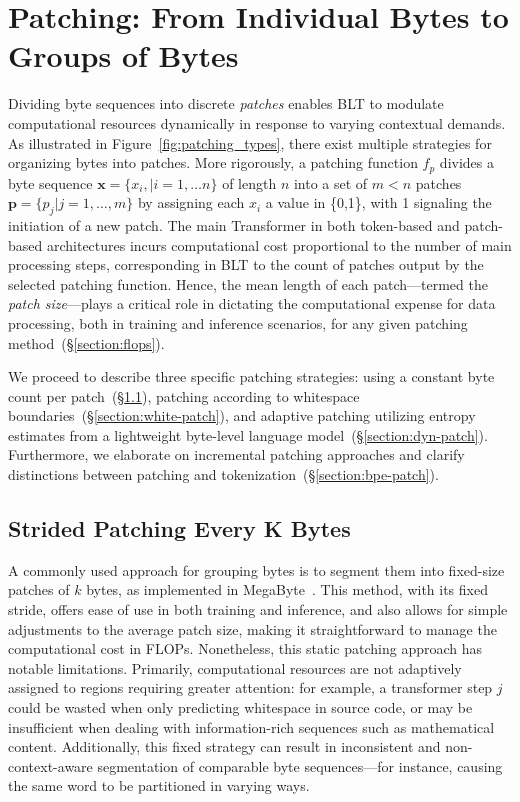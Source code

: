 \section{Patching: From Individual Bytes to Groups of Bytes}
\label{section:patching}

Dividing byte sequences into discrete \textit{patches} enables {\textsc BLT} to modulate computational resources dynamically in response to varying contextual demands. As illustrated in Figure~\ref{fig:patching_types}, there exist multiple strategies for organizing bytes into patches. More rigorously, a patching function $f_p$ divides a byte sequence $\pmb{x}=\{x_i,|i=1,\ldots n\}$ of length $n$ into a set of $m < n$ patches $\pmb{p}=\{p_j|j=1,\ldots,m\}$ by assigning each $x_i$ a value in \{0,1\}, with 1 signaling the initiation of a new patch. The main Transformer in both token-based and patch-based architectures incurs computational cost proportional to the number of main processing steps, corresponding in {\textsc BLT} to the count of patches output by the selected patching function. Hence, the mean length of each patch—termed the \textit{patch size}—plays a critical role in dictating the computational expense for data processing, both in training and inference scenarios, for any given patching method~(\S\ref{section:flops}).

We proceed to describe three specific patching strategies: using a constant byte count per patch~(\S\ref{section:static-patch}), patching according to whitespace boundaries~(\S\ref{section:white-patch}), and adaptive patching utilizing entropy estimates from a lightweight byte-level language model~(\S\ref{section:dyn-patch}). Furthermore, we elaborate on incremental patching approaches and clarify distinctions between patching and tokenization~(\S\ref{section:bpe-patch}).

\subsection{Strided Patching Every K Bytes}
\label{section:static-patch}

A commonly used approach for grouping bytes is to segment them into fixed-size patches of $k$ bytes, as implemented in MegaByte~\citep{yu2023megabyte}. This method, with its fixed stride, offers ease of use in both training and inference, and also allows for simple adjustments to the average patch size, making it straightforward to manage the computational cost in FLOPs. Nonetheless, this static patching approach has notable limitations. Primarily, computational resources are not adaptively assigned to regions requiring greater attention: for example, a transformer step $j$ could be wasted when only predicting whitespace in source code, or may be insufficient when dealing with information-rich sequences such as mathematical content. Additionally, this fixed strategy can result in inconsistent and non-context-aware segmentation of comparable byte sequences—for instance, causing the same word to be partitioned in varying ways.

